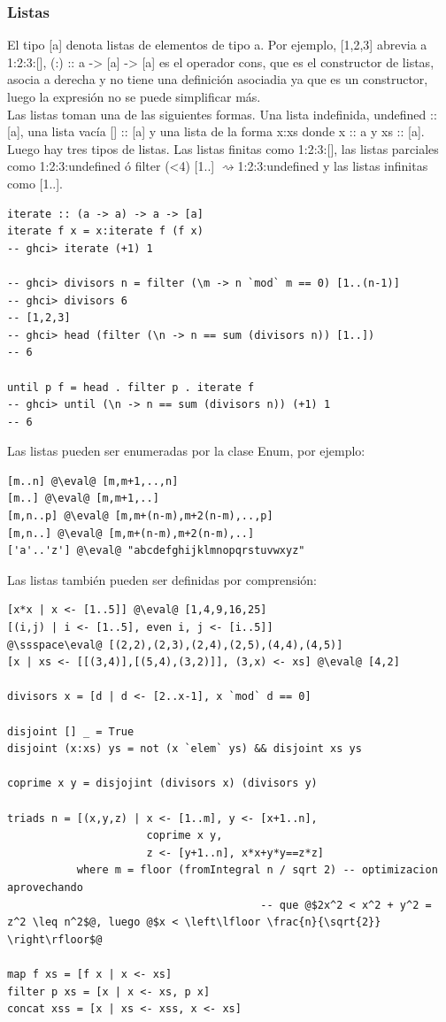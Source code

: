 \documentclass[12pt]{extarticle}
\def\eval{$\rightsquigarrow$}
\def\ssspace{\space\space\space}
\begin{document}
\subsubsection{Listas}
El tipo [a] denota listas de elementos de tipo a. Por ejemplo, [1,2,3] abrevia a 1:2:3:[], (:) :: a -> [a] -> [a] es el operador cons, que es el constructor de listas, asocia a derecha y no tiene una definición asociadia ya que es un constructor, luego la expresión no se puede simplificar más. \\
Las listas toman una de las siguientes formas. Una lista indefinida, undefined :: [a], una lista vacía [] :: [a] y una lista de la forma x:xs donde x :: a y xs :: [a]. \\
Luego hay tres tipos de listas. Las listas finitas como 1:2:3:[], las listas parciales como 1:2:3:undefined ó filter (<4) [1..] \eval 1:2:3:undefined y las listas infinitas como [1..]. \\

\begin{verbatim}
iterate :: (a -> a) -> a -> [a]
iterate f x = x:iterate f (f x)
-- ghci> iterate (+1) 1

-- ghci> divisors n = filter (\m -> n `mod` m == 0) [1..(n-1)]
-- ghci> divisors 6
-- [1,2,3]
-- ghci> head (filter (\n -> n == sum (divisors n)) [1..])
-- 6

until p f = head . filter p . iterate f
-- ghci> until (\n -> n == sum (divisors n)) (+1) 1
-- 6
\end{verbatim}

Las listas pueden ser enumeradas por la clase Enum, por ejemplo:

\begin{verbatim}
[m..n] @\eval@ [m,m+1,..,n]
[m..] @\eval@ [m,m+1,..]
[m,n..p] @\eval@ [m,m+(n-m),m+2(n-m),..,p]
[m,n..] @\eval@ [m,m+(n-m),m+2(n-m),..]
['a'..'z'] @\eval@ "abcdefghijklmnopqrstuvwxyz"
\end{verbatim}

Las listas también pueden ser definidas por comprensión:

\begin{verbatim}
[x*x | x <- [1..5]] @\eval@ [1,4,9,16,25]
[(i,j) | i <- [1..5], even i, j <- [i..5]]
@\ssspace\eval@ [(2,2),(2,3),(2,4),(2,5),(4,4),(4,5)]
[x | xs <- [[(3,4)],[(5,4),(3,2)]], (3,x) <- xs] @\eval@ [4,2]

divisors x = [d | d <- [2..x-1], x `mod` d == 0]

disjoint [] _ = True
disjoint (x:xs) ys = not (x `elem` ys) && disjoint xs ys

coprime x y = disjojint (divisors x) (divisors y)

triads n = [(x,y,z) | x <- [1..m], y <- [x+1..n],
                      coprime x y,
                      z <- [y+1..n], x*x+y*y==z*z]
           where m = floor (fromIntegral n / sqrt 2) -- optimizacion aprovechando 
                                        -- que @$2x^2 < x^2 + y^2 = z^2 \leq n^2$@, luego @$x < \left\lfloor \frac{n}{\sqrt{2}} \right\rfloor$@

map f xs = [f x | x <- xs]
filter p xs = [x | x <- xs, p x]
concat xss = [x | xs <- xss, x <- xs]
\end{verbatim}
\end{document}

